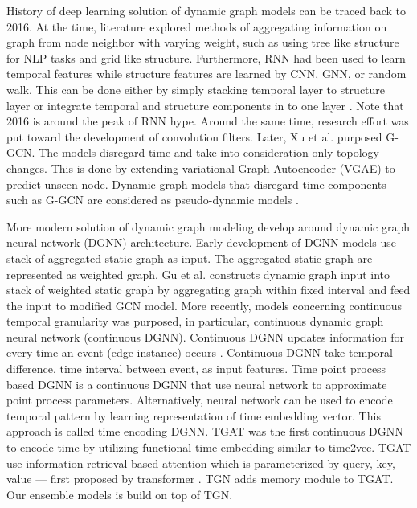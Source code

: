 \documentclass{IEEEtran}
\begin{document}
History of deep learning solution of dynamic graph models can be traced back to 2016. At the time, literature explored methods of aggregating information on graph from node neighbor with varying weight, such as using tree like structure for NLP tasks and grid like structure. Furthermore, RNN had been used to learn temporal features while structure features are learned by CNN, GNN, or random walk. This can be done either by simply stacking temporal layer to structure layer or integrate temporal and structure components in to one layer \cite{seo2018structured}. Note that 2016 is around the peak of RNN hype. Around the same time, research effort was put toward the development of convolution filters. Later, Xu et al. \cite{xu2019generative} purposed G-GCN. The models disregard time and take into consideration only topology changes. This is done by extending variational Graph Autoencoder (VGAE) \cite{kipf2016variational} to predict unseen node. Dynamic graph models that disregard time components such as G-GCN are considered as pseudo-dynamic models \cite{skardingFoundationsModelingDynamic2021}.

More modern solution of dynamic graph modeling develop around dynamic graph neural network (DGNN) architecture. Early development of DGNN models use stack of aggregated static graph as input. The aggregated static graph are represented as weighted graph. Gu et al. \cite{qu2020continuous} constructs dynamic graph input into stack of weighted static graph by aggregating graph within fixed interval and feed the input to modified GCN model. More recently, models concerning continuous temporal granularity was purposed, in particular, continuous dynamic graph neural network (continuous DGNN). Continuous DGNN updates information for every time an event (edge instance) occurs \cite{skardingFoundationsModelingDynamic2021}. Continuous DGNN take temporal difference, time interval between event, as input features. Time point process based DGNN is a continuous DGNN that use neural network to approximate point process parameters. Alternatively, neural network can be used to encode temporal pattern by learning representation of time embedding vector. This approach is called time encoding DGNN. TGAT was the first continuous DGNN to encode time by utilizing functional time embedding similar to time2vec. TGAT use information retrieval based attention which is parameterized by query, key, value --- first proposed by transformer \cite{vaswani2017attention}. TGN \cite{rossi2020temporal} adds memory module to TGAT. Our ensemble models is build on top of TGN.
\end{document}

